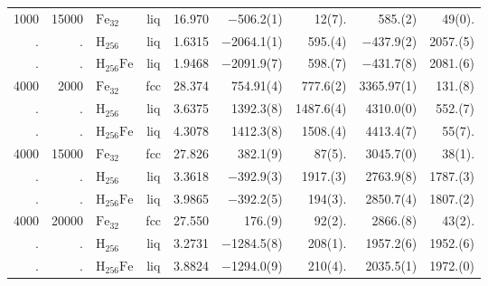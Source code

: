 \begin{table}
\begin{adjustbox}{max width=\textwidth}
\begin{tabular}{rrlcrrrrr}
1000  &  15000  &  $\mathrm{Fe}_{32}$     &  liq  &  16.970  &  $-$506.2(1)\phantom{0}   &  12(7).\phantom{0(0)}   &  585.(2)\phantom{00}     &  49(0).\phantom{(0)}  \\
.     &  .      &  $\mathrm{H}_{256}$    &  liq  &  1.6315  &  $-$2064.1(1)\phantom{0}  &  595.(4)\phantom{0}     &  $-$437.9(2)\phantom{0}  &  2057.(5)             \\
.     &  .      &  $\mathrm{H}_{256}\mathrm{Fe}$  &  liq  &  1.9468  &  $-$2091.9(7)\phantom{0}  &  598.(7)\phantom{0}     &  $-$431.7(8)\phantom{0}  &  2081.(6)             \\
4000  &  2000   &  $\mathrm{Fe}_{32}$     &  fcc  &  28.374  &  754.91(4)                &  777.6(2)\phantom{0}    &  3365.97(1)              &  131.(8)              \\
.     &  .      &  $\mathrm{H}_{256}$    &  liq  &  3.6375  &  1392.3(8)\phantom{0}     &  1487.6(4)              &  4310.0(0)\phantom{0}    &  552.(7)              \\
.     &  .      &  $\mathrm{H}_{256}\mathrm{Fe}$  &  liq  &  4.3078  &  1412.3(8)\phantom{0}     &  1508.(4)\phantom{0}    &  4413.4(7)\phantom{0}    &  55(7).\phantom{(0)}  \\
4000  &  15000  &  $\mathrm{Fe}_{32}$     &  fcc  &  27.826  &  382.1(9)\phantom{0}      &  87(5).\phantom{0(0)}   &  3045.7(0)\phantom{0}    &  38(1).\phantom{(0)}  \\
.     &  .      &  $\mathrm{H}_{256}$    &  liq  &  3.3618  &  $-$392.9(3)\phantom{0}   &  1917.(3)\phantom{0}    &  2763.9(8)\phantom{0}    &  1787.(3)             \\
.     &  .      &  $\mathrm{H}_{256}\mathrm{Fe}$  &  liq  &  3.9865  &  $-$392.2(5)\phantom{0}   &  194(3).\phantom{0(0)}  &  2850.7(4)\phantom{0}    &  1807.(2)             \\
4000  &  20000  &  $\mathrm{Fe}_{32}$     &  fcc  &  27.550  &  176.(9)\phantom{00}      &  92(2).\phantom{0(0)}   &  2866.(8)\phantom{00}    &  43(2).\phantom{(0)}  \\
.     &  .      &  $\mathrm{H}_{256}$    &  liq  &  3.2731  &  $-$1284.5(8)\phantom{0}  &  208(1).\phantom{0(0)}  &  1957.2(6)\phantom{0}    &  1952.(6)             \\
.     &  .      &  $\mathrm{H}_{256}\mathrm{Fe}$  &  liq  &  3.8824  &  $-$1294.0(9)\phantom{0}  &  210(4).\phantom{0(0)}  &  2035.5(1)\phantom{0}    &  1972.(0)             \\
\hline
\end{tabular}%
\end{adjustbox}
\end{table}

